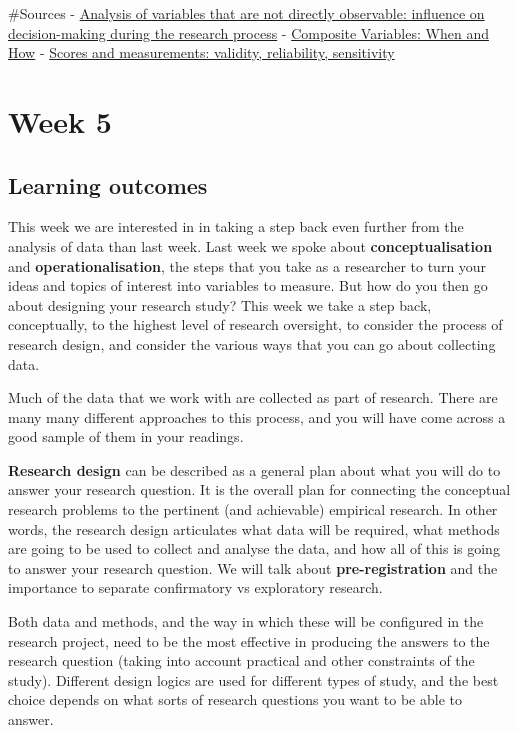 \documentclass[
]{book}
\begin{document}
\#Sources
- \href{http://www.scielo.br/scielo.php?script=sci_arttext\&pid=S0080-62342014000100146}{Analysis of variables that are not directly observable: influence on decision-making during the research process}
- \href{https://www.ncbi.nlm.nih.gov/pmc/articles/PMC5459482/}{Composite Variables: When and How}
- \href{http://onlinelibrary.wiley.com.manchester.idm.oclc.org/doi/10.1002/9780470024522.ch4/pdf}{Scores and measurements: validity, reliability, sensitivity}

\hypertarget{week5}{%
\chapter{Week 5}\label{week5}}

\hypertarget{learning-outcomes-4}{%
\section{Learning outcomes}\label{learning-outcomes-4}}

This week we are interested in in taking a step back even further from the analysis of data than last week. Last week we spoke about \textbf{conceptualisation} and \textbf{operationalisation}, the steps that you take as a researcher to turn your ideas and topics of interest into variables to measure. But how do you then go about designing your research study? This week we take a step back, conceptually, to the highest level of research oversight, to consider the process of research design, and consider the various ways that you can go about collecting data.

Much of the data that we work with are collected as part of research. There are many many different approaches to this process, and you will have come across a good sample of them in your readings.

\textbf{Research design} can be described as a general plan about what you will do to answer your research question. It is the overall plan for connecting the conceptual research problems to the pertinent (and achievable) empirical research. In other words, the research design articulates what data will be required, what methods are going to be used to collect and analyse the data, and how all of this is going to answer your research question. We will talk about \textbf{pre-registration} and
the importance to separate confirmatory vs exploratory research.

Both data and methods, and the way in which these will be configured in the research project, need to be the most effective in producing the answers to the research question (taking into account practical and other constraints of the study). Different design logics are used for different types of study, and the best choice depends on what sorts of research questions you want to be able to answer.
\end{document}
